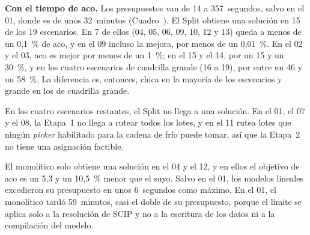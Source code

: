 {\bf Con el tiempo de \ac{aco}.} Los presupuestos van de 14 a 357~segundos, salvo en el 01, donde es de unos
32~minutos (Cuadro~). El Split obtiene una
solución en 15 de los 19 escenarios. En 7 de ellos (04, 05, 06, 09, 10, 12 y 13) queda a
menos de un 0,1~\% de \ac{aco}, y en el 09 incluso la mejora, por menos de un
0,01~\%. En el 02 y el 03, \ac{aco} es mejor por menos de un 1~\%; en el 15 y
el 14, por un 15
y un 30~\%, y en los cuatro escenarios de cuadrilla grande (16 a 19), por entre un
46 y un 58~\%. La diferencia es, entonces, chica en la mayoría de los escenarios y grande en
los de cuadrilla grande.

En los cuatro escenarios restantes, el Split no llega a una solución. En el
01, el 07 y el 08, la Etapa~1 no llega a rutear todos
los lotes, y en el 11 rutea lotes que ningún {\em picker} habilitado para la cadena de
frío puede tomar, así que la Etapa~2 no tiene una asignación factible.

El monolítico solo obtiene una solución en el 04 y el 12, y en ellos el
objetivo de \ac{aco} es un 5,3 y un 10,5~\% menor que el suyo. Salvo en el 01, los modelos lineales excedieron su
presupuesto en unos 6~segundos como máximo. En el 01, el monolítico tardó
59~minutos, casi el doble de su presupuesto, porque el límite se aplica solo
a la resolución de SCIP y no a la escritura de los datos ni a la compilación
del modelo.

